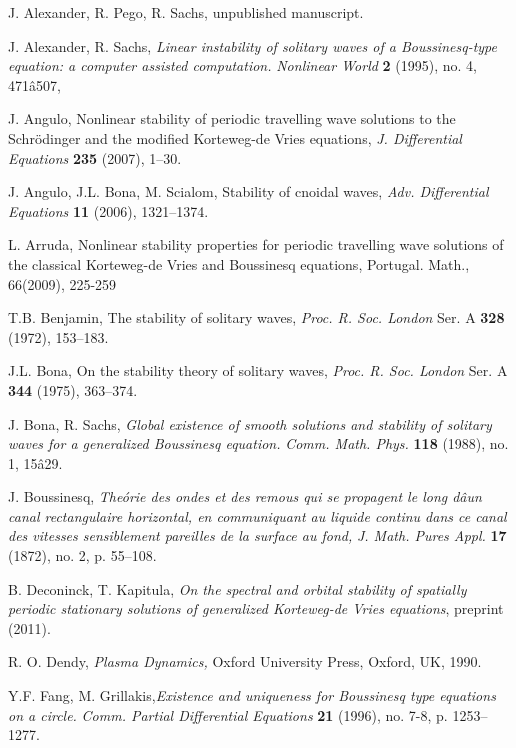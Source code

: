 \documentclass[final,11pt,leqno]{amsart}
\begin{document}
\begin{thebibliography}{100}

 J. Alexander, R. Pego, R. Sachs, unpublished manuscript. 

 J. Alexander, R. Sachs, \emph{Linear instability of solitary waves of a Boussinesq-type equation: a computer assisted computation.} {\em  Nonlinear World}
{\bf  2} (1995), no. 4, 471â507,

 J. Angulo,  Nonlinear stability of periodic travelling
wave solutions to the Schr\"odinger and the modified Korteweg-de
Vries equations, {\it J. Differential Equations} {\bf 235} (2007),
1--30.

 J. Angulo, J.L. Bona, M. Scialom, Stability of
cnoidal waves, {\it Adv. Differential Equations} {\bf 11} (2006),
1321--1374.

 L. Arruda, Nonlinear stability properties for
periodic travelling wave solutions of the classical Korteweg-de
Vries and Boussinesq equations, Portugal. Math., 66(2009), 225-259

  T.B. Benjamin,  The stability of solitary waves,
 {\it Proc. R. Soc. London} Ser. A {\bf 328} (1972), 153--183.

  J.L. Bona, On the stability theory of solitary waves,
 {\it Proc. R. Soc. London} Ser. A {\bf 344} (1975), 363--374.

  J. Bona, R. Sachs, \emph{Global existence of smooth solutions and stability of solitary waves for a generalized Boussinesq equation.}
{\em  Comm. Math. Phys.} {\bf 118} (1988), no. 1, 15â29.

 J. Boussinesq, \emph{The\'orie des ondes et des remous qui
se propagent le long dâun canal rectangulaire horizontal, en communiquant au liquide continu dans ce canal des vitesses sensiblement pareilles de la
surface au fond,} {\em J. Math. Pures Appl.} {\bf 17} (1872), no. 2, p. 55--108.

 B. Deconinck, T. Kapitula, \emph{On the spectral and orbital stability of spatially periodic stationary solutions of generalized Korteweg-de Vries
equations}, preprint (2011).

  R. O. Dendy, {\em Plasma Dynamics,}
 Oxford University Press, Oxford, UK, 1990.

 Y.F. Fang, M. Grillakis,\emph{Existence and uniqueness for Boussinesq type equations on a circle.} {\em Comm. Partial Differential Equations} {\bf 21}
 (1996), no. 7-8, p. 1253--1277.


\end{thebibliography}
\end{document}
